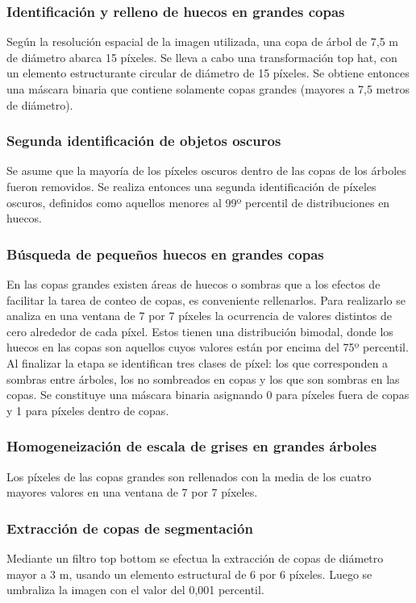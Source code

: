 \subsubsection{Identificación y relleno de huecos en grandes copas}
Según la resolución espacial de la imagen utilizada, una copa de árbol de 7,5 m de diámetro abarca 15 píxeles. Se lleva a cabo una transformación top hat, con un elemento estructurante circular de diámetro de 15 píxeles. Se obtiene entonces una máscara binaria que contiene solamente copas grandes (mayores a 7,5 metros de diámetro).
\subsubsection{ Segunda identificación de objetos oscuros}
Se asume que la mayoría de los píxeles oscuros dentro de las copas de los árboles fueron removidos. Se realiza entonces una segunda identificación de píxeles oscuros, definidos como aquellos menores al 99º percentil de distribuciones en huecos.
\subsubsection{Búsqueda de pequeños huecos en grandes copas}
En las copas grandes existen áreas de huecos o sombras que a los efectos de facilitar la tarea de conteo de copas, es conveniente rellenarlos. Para realizarlo se analiza en una ventana de 7 por 7 píxeles la ocurrencia de valores distintos de cero alrededor de cada píxel. Estos tienen una distribución bimodal, donde los huecos en las copas son aquellos cuyos valores están por encima del 75º percentil. Al finalizar la etapa se identifican tres clases de píxel: los que corresponden a sombras entre árboles, los no sombreados en copas y los que son sombras en las copas. Se constituye una máscara binaria asignando 0 para píxeles fuera de copas y 1 para píxeles dentro de copas.
\subsubsection{Homogeneización de escala de grises en grandes árboles}
Los píxeles de las copas grandes son rellenados con la media de los cuatro mayores valores en una ventana de 7 por 7 píxeles.
\subsubsection{Extracción de copas de segmentación}
Mediante un filtro top bottom se efectua la extracción de copas de diámetro mayor a 3 m, usando un elemento estructural de 6 por 6 píxeles. Luego se umbraliza la imagen con el valor del 0,001 percentil.
